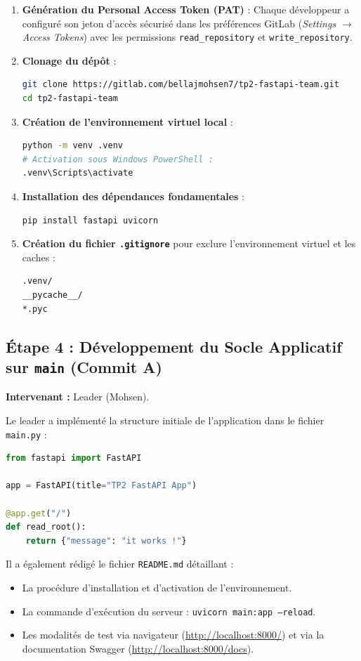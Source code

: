 \documentclass[a4paper,12pt]{article}
\begin{document}
\begin{enumerate}
    \item \textbf{Génération du Personal Access Token (PAT)} : Chaque développeur a configuré son jeton d'accès sécurisé dans les préférences GitLab (\textit{Settings $\rightarrow$ Access Tokens}) avec les permissions \texttt{read\_repository} et \texttt{write\_repository}.
    \item \textbf{Clonage du dépôt} :
\begin{lstlisting}[language=bash]
git clone https://gitlab.com/bellajmohsen7/tp2-fastapi-team.git
cd tp2-fastapi-team
\end{lstlisting}
    \item \textbf{Création de l'environnement virtuel local} :
\begin{lstlisting}[language=bash]
python -m venv .venv
# Activation sous Windows PowerShell :
.venv\Scripts\activate
\end{lstlisting}
    \item \textbf{Installation des dépendances fondamentales} :
\begin{lstlisting}[language=bash]
pip install fastapi uvicorn
\end{lstlisting}
    \item \textbf{Création du fichier \texttt{.gitignore}} pour exclure l'environnement virtuel et les caches :
\begin{lstlisting}[language=bash]
.venv/
__pycache__/
*.pyc
\end{lstlisting}
\end{enumerate}

\subsection{Étape 4 : Développement du Socle Applicatif sur \texttt{main} (Commit A)}
\textbf{Intervenant :} Leader (Mohsen).

Le leader a implémenté la structure initiale de l'application dans le fichier \texttt{main.py} :
\begin{lstlisting}[language=Python]
from fastapi import FastAPI

app = FastAPI(title="TP2 FastAPI App")

@app.get("/")
def read_root():
    return {"message": "it works !"}
\end{lstlisting}

Il a également rédigé le fichier \texttt{README.md} détaillant :
\begin{itemize}
    \item La procédure d'installation et d'activation de l'environnement.
    \item La commande d'exécution du serveur : \texttt{uvicorn main:app --reload}.
    \item Les modalités de test via navigateur (\url{http://localhost:8000/}) et via la documentation Swagger (\url{http://localhost:8000/docs}).
\end{itemize}
\end{document}
